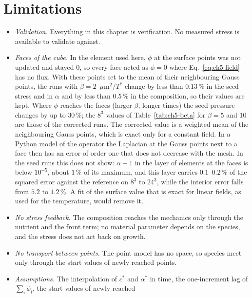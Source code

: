\section{Limitations}
\label{sec:ch5-limitations}

\begin{itemize}
\item \emph{Validation.} Everything in this chapter is verification. No
      measured stress is available to validate against.
\item \emph{Faces of the cube.} In the element used here, $\phi$ at the surface
      points was not updated and stayed $0$, so every face acted as $\phi=0$
      where Eq.~\eqref{eq:ch5-field} has no flux. With these points set to the
      mean of their neighbouring Gauss points, the runs with
      $\beta=2$~$\mu$m$^2/T^*$ change by less than $0.13\,\%$ in the seed stress
      and in $\alpha$ and by less than $0.5\,\%$ in the composition, so their
      values are kept. Where $\phi$ reaches the faces (larger $\beta$, longer
      times) the seed pressure changes by up to $30\,\%$; the $8^3$ values of
      Table~\ref{tab:ch5-beta} for $\beta=5$ and $10$ are those of the
      corrected runs.
      The corrected value is a weighted mean of the neighbouring Gauss points,
      which is exact only for a constant field. In a Python model of the
      operator the Laplacian at the Gauss points next to a face then has an
      error of order one that does not decrease with the mesh. In the seed
      runs this does not show: $\alpha-1$ in the layer of elements at the faces
      is below $10^{-5}$, about $1\,\%$ of its maximum, and this layer carries
      $0.1$--$0.2\,\%$ of the squared error against the reference on $8^3$ to
      $24^3$, while the interior error falls from $5.2$ to $1.2\,\%$. A fit of the
      surface value that is exact for linear fields, as used for the
      temperature, would remove it.
\item \emph{No stress feedback.} The composition reaches the mechanics only
      through the nutrient and the front term; no material parameter depends on
      the species, and the stress does not act back on growth.
\item \emph{No transport between points.} The point model has no space, so species
      meet only through the start values of newly reached points.
\item \emph{Assumptions.} The interpolation of $c^*$ and $\alpha^*$ in time, the
      one-increment lag of $\sum_i\bar\phi_i$, the start values of newly reached

\end{itemize}
